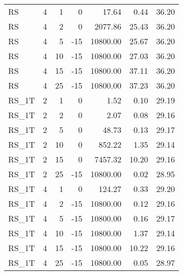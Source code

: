 \begin{center}
\begin{longtable}{lrrrrrr}
  RS     & 4 & 1 &   0 & 17.64 & 0.44 & 36.20 \\ 
  RS     & 4 & 2 &   0 & 2077.86 & 25.43 & 36.20 \\ 
  RS     & 4 & 5 & -15 & 10800.00 & 25.67 & 36.20 \\ 
  RS     & 4 & 10 & -15 & 10800.00 & 27.03 & 36.20 \\ 
  RS     & 4 & 15 & -15 & 10800.00 & 37.11 & 36.20 \\ 
  RS     & 4 & 25 & -15 & 10800.00 & 37.23 & 36.20 \\ 
  RS\_1T     & 2 & 1 &   0 & 1.52 & 0.10 & 29.19 \\ 
  RS\_1T     & 2 & 2 &   0 & 2.07 & 0.08 & 29.16 \\ 
  RS\_1T     & 2 & 5 &   0 & 48.73 & 0.13 & 29.17 \\ 
  RS\_1T     & 2 & 10 &   0 & 852.22 & 1.35 & 29.14 \\ 
  RS\_1T     & 2 & 15 &   0 & 7457.32 & 10.20 & 29.16 \\ 
  RS\_1T     & 2 & 25 & -15 & 10800.00 & 0.02 & 28.95 \\ 
  RS\_1T     & 4 & 1 &   0 & 124.27 & 0.33 & 29.20 \\ 
  RS\_1T     & 4 & 2 & -15 & 10800.00 & 0.12 & 29.16 \\ 
  RS\_1T     & 4 & 5 & -15 & 10800.00 & 0.16 & 29.17 \\ 
  RS\_1T     & 4 & 10 & -15 & 10800.00 & 1.37 & 29.14 \\ 
  RS\_1T     & 4 & 15 & -15 & 10800.00 & 10.22 & 29.16 \\ 
  RS\_1T     & 4 & 25 & -15 & 10800.00 & 0.05 & 28.97 \\ 
\end{longtable}
\end{center}
